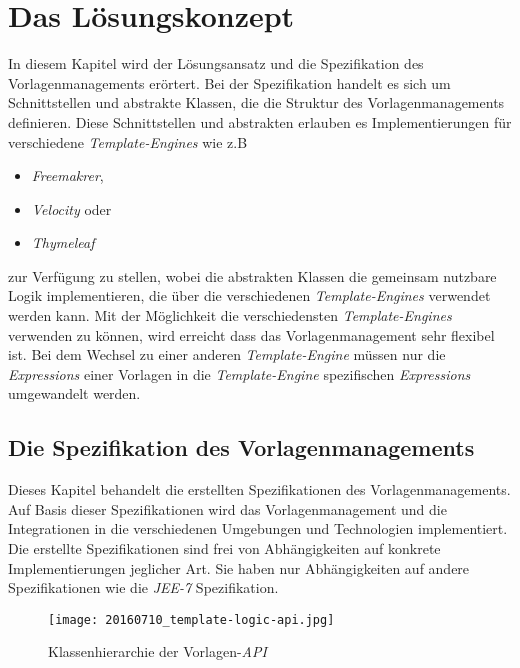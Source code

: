 \chapter{Das Lösungskonzept}
\label{cha:Lösungskonzept}
In diesem Kapitel wird der Lösungsansatz und die Spezifikation des Vorlagenmanagements erörtert. Bei der Spezifikation handelt es sich um Schnittstellen und abstrakte Klassen, die die Struktur des Vorlagenmanagements definieren. Diese Schnittstellen und abstrakten erlauben es Implementierungen für verschiedene \emph{Template-Engines} wie z.B
\begin{itemize}
	\item \emph{Freemakrer},
	\item \emph{Velocity} oder
	\item \emph{Thymeleaf}
\end{itemize}
zur Verfügung zu stellen, wobei die abstrakten Klassen die gemeinsam nutzbare Logik implementieren, die über die verschiedenen \emph{Template-Engines} verwendet werden kann.
\newline
\newline
Mit der Möglichkeit die verschiedensten \emph{Template-Engines} verwenden zu können, wird erreicht dass das Vorlagenmanagement sehr flexibel ist. Bei dem Wechsel zu einer anderen \emph{Template-Engine} müssen nur die \emph{Expressions} einer Vorlagen in die \emph{Template-Engine} spezifischen \emph{Expressions} umgewandelt werden.
\ \newpage

\section{Die Spezifikation des Vorlagenmanagements}
Dieses Kapitel behandelt die erstellten Spezifikationen des Vorlagenmanagements. Auf Basis dieser Spezifikationen wird das Vorlagenmanagement und die Integrationen in die verschiedenen Umgebungen und Technologien implementiert. Die erstellte Spezifikationen sind frei von Abhängigkeiten auf konkrete Implementierungen jeglicher Art. Sie haben nur Abhängigkeiten auf andere Spezifikationen wie die \emph{JEE-7} Spezifikation.

\begin{figure}[h]
\centering
\texttt{[image: 20160710\_template-logic-api.jpg]} %
\caption{Klassenhierarchie der Vorlagen-\emph{API}}
\label{fig:template-logic-api-hierarchy}
\end{figure}

